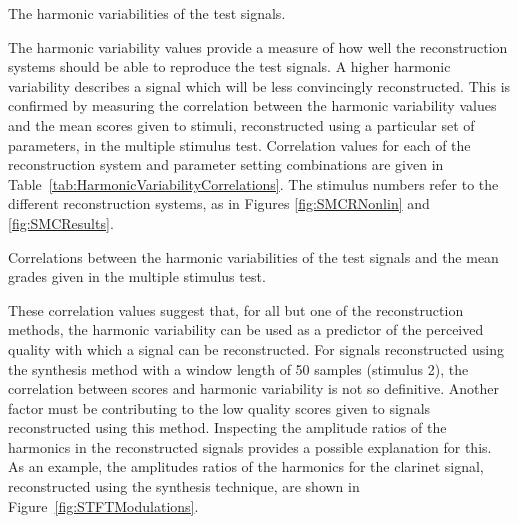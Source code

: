 			\begin{table}[h!]
				\centering
				
				\caption{The harmonic variabilities of the test signals.}
				\label{tab:HarmonicVariabilities}
			\end{table}

			The harmonic variability values provide a measure of how well the reconstruction systems should be
			able to reproduce the test signals. A higher harmonic variability describes a signal which will be
			less convincingly reconstructed. This is confirmed by measuring the correlation between the
			harmonic variability values and the mean scores given to stimuli, reconstructed using a particular
			set of parameters, in the multiple stimulus test. Correlation values for each of the reconstruction
			system and parameter setting combinations are given in
			Table~\ref{tab:HarmonicVariabilityCorrelations}. The stimulus numbers refer to the different
			reconstruction systems, as in Figures \ref{fig:SMCRNonlin} and \ref{fig:SMCResults}.

			\begin{table}[h!]
				\centering
				
				\caption{Correlations between the harmonic variabilities of the test signals and 
					 the mean grades given in the multiple stimulus test.}
				\label{tab:HarmonicVariabilityCorrelations}
			\end{table}

			These correlation values suggest that, for all but one of the reconstruction methods, the harmonic
			variability can be used as a predictor of the perceived quality with which a signal can be
			reconstructed.  For signals reconstructed using the synthesis method with a window length of 50
			samples (stimulus 2), the correlation between scores and harmonic variability is not so definitive.
			Another factor must be contributing to the low quality scores given to signals reconstructed using
			this method. Inspecting the amplitude ratios of the harmonics in the reconstructed signals provides
			a possible explanation for this.  As an example, the amplitudes ratios of the harmonics for the
			clarinet signal, reconstructed using the synthesis technique, are shown in
			Figure~\ref{fig:STFTModulations}.

